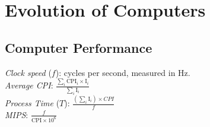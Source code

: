 \section{Evolution of Computers}
\subsection*{Computer Performance}
\emph{Clock speed} ($f$): cycles per second, measured in Hz.\\
\emph{Average CPI}: $\frac{\sum_i \text{CPI}_i\times \text{I}_i}{\sum_i \text{I}_i}$\\
\emph{Process Time} ($T$): $\frac{(\sum_i\text{I}_i)\times CPI}{f}$\\
\emph{MIPS}: $\frac{f}{\text{CPI}\times 10^6}$